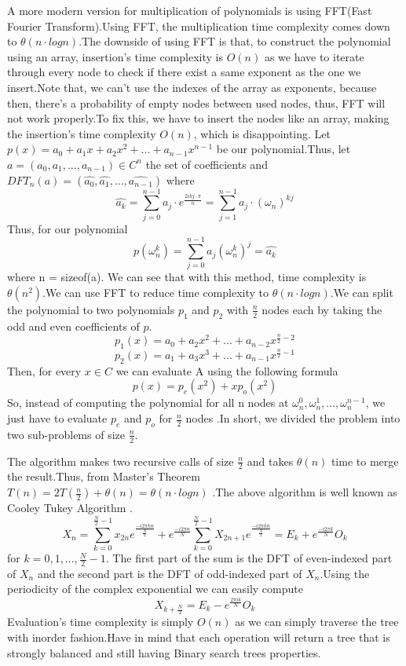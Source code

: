 \documentclass[journal,article,submit,moreauthors,algorithms]{Definitions/mdpi}
\begin{document}
A more modern version for multiplication of polynomials is using FFT(Fast Fourier Transform).Using FFT, the multiplication time complexity comes down to $\theta(n \cdot logn)$.The downside of using FFT is that, to construct the polynomial using an array, insertion's time complexity is $O(n)$ as we have to iterate through every node to check if there exist a same exponent as the one we insert.Note that, we can't use the indexes of the array as exponents, because then, there's a probability of empty nodes between used nodes, thus, FFT will not work properly.To fix this, we have to insert the nodes like an array, making the insertion's time complexity $O(n)$, which is disappointing.
Let $p(x) = a_0 + a_1x + a_2x^2 + ... + a_{n-1}x^{n-1}$ be our polynomial.Thus, let $a = (a_0, a_1, ..., a_{n-1}) \in C^n$ the set of coefficients and $DFT_n(a) = (\hat{a_0}, \hat{a_1}, ..., \hat{a_{n-1}})$ where \[\hat{a_k} = \sum_{j=0}^{n-1}a_j \cdot e^{\frac{2ikj \cdot \pi}{n}} = \sum_{j = 1}^{n - 1}a_j \cdot (\omega_n)^{kj}\]
Thus, for our polynomial \[p(\omega_n^k) = \sum_{j=0}^{n-1} a_j(\omega_n^k)^j = \hat{a_k}\] where n = sizeof(a).
We can see that with this method, time complexity is $\theta(n^2)$.We can use FFT to reduce time complexity to $\theta(n \cdot logn)$.We can split the polynomial to two polynomials $p_1$ and $p_2$ with $\frac{n}{2}$ nodes each by taking the odd and even coefficients of $p$.\[p_1(x) = a_0 + a_2x^2 + ... + a_{n-2}x^{\frac{n}{2}-2}\] \[p_2(x) = a_1 + a_3x^3 + ... + a_{n-1}x^{\frac{n}{2} - 1}\]
Then, for every $x \in C$ we can evaluate A using the following formula \[p(x) = p_e(x^2) + xp_o(x^2)\]
So, instead of computing the polynomial for all n nodes at $\omega^0_n, \omega^1_n, ..., \omega^{n-1}_n$, we just have to evaluate $p_e$ and $p_o$ for $\frac{n}{2}$ nodes \cite{FFT Rec}.In short, we divided the problem into two sub-problems of size $\frac{n}{2}$.

The algorithm makes two recursive calls of size $\frac{n}{2}$ and takes $\theta(n)$ time to merge the result.Thus, from Master's Theorem $T(n) = 2T(\frac{n}{2}) + \theta(n) = \theta(n \cdot logn)$ \cite{Masters Theorem}.The above algorithm is well known as Cooley Tukey Algorithm \cite{Cooley Tukey,Cooley Tukey 2}. \[X_n = \sum_{k = 0}^{\frac{N}{2} - 1} x_{2n}e^{\frac{-i 2 \pi k n}{\frac{N}{2}}} + e^{\frac{-i 2 \pi n}{N}}\sum_{k=0}^{\frac{N}{2} - 1} X_{2n + 1} e^{\frac{-i 2 \pi k n}{\frac{N}{2}}} = E_k + e^{\frac{-i 2 \pi k}{N}} O_k\] for $k = 0,1,...,\frac{N}{2} - 1$.
The first part of the sum is the DFT of even-indexed part of $X_n$ and the second part is the DFT of odd-indexed part of $X_n$.Using the periodicity of the complex exponential we can easily compute \[X_{k + \frac{N}{2}} = E_k - e^{\frac{2 \pi i k}{N}} O_k\]
\medbreak
Evaluation's time complexity is simply $O(n)$ as we can simply traverse the tree with inorder fashion.Have in mind that each operation will return a tree that is strongly balanced and still having Binary search trees properties.

\end{document}
